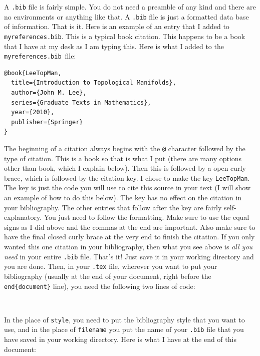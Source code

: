 \documentclass{article}
\newcommand{\nid}{\noindent} %
\newcommand{\myrefs}{\texttt{myreferences.bib}}
\begin{document}
A \verb|.bib| file is fairly simple.  You do not need a preamble of any kind and there are no environments or anything like that.  A \verb|.bib| file is just a formatted data base of information. That is it.  Here is an example of an entry that I added to \myrefs.  This is a typical book citation.  This happens to be a book that I have at my desk as I am typing this.  Here is what I added to the \myrefs\ file:
\begin{verbatim}
@book{LeeTopMan,
  title={Introduction to Topological Manifolds},
  author={John M. Lee},
  series={Graduate Texts in Mathematics},
  year={2010},
  publisher={Springer}
}
\end{verbatim}

\nid The beginning of a citation always begins with the \verb|@| character followed by the type of citation.  This is a book so that is what I put (there are many options other than book, which I explain below). Then this is followed by a open curly brace, which is followed by the citation key.  I chose to make the key \verb|LeeTopMan|.  The key is just the code you will use to cite this source in your text (I will show an example of how to do this below).  The key has no effect on the citation in your bibliography.  The other entries that follow after the key are fairly self-explanatory.  You just need to follow the formatting.  Make sure to use the equal signs as I did above and the commas at the end are important.  Also make sure to have the final closed curly brace at the very end to finish the citation.  If you only wanted this one citation in your bibliography, then what you see above is \emph{all you need} in your entire \verb|.bib| file.  That's it!  Just save it in your working directory and you are done. Then, in your \verb|.tex| file, wherever you want to put your bibliography (usually at the end of your document, right before the \verb|end{document}| line), you need the following two lines of code:
\begin{verbatim}


\end{verbatim}

In the place of \verb|style|, you need to put the bibliography style that you want to use, and in the place of \verb|filename| you put the name of your \verb|.bib| file that you have saved in your working directory.  Here is what I have at the end of this document:

\begin{verbatim}


\end{verbatim}
\end{document}
